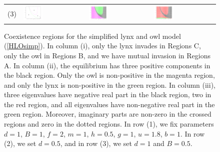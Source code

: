 \documentclass[12pt]{UOthesis}
\theoremstyle{remarkstyle}
\begin{document}
\begin{figure}[h!]
\begin{tabular}{m{0.07cm} m{4.5cm}  m{4.5cm}  m{4.5cm}}
		(3) & \includegraphics[width=0.33\textwidth]{HLOSimpMutualInvasion3.png} & \includegraphics[width=0.33\textwidth]{HLOSimpSSE3.png} & \includegraphics[width=0.33\textwidth]{HLOSimpE3.png}\\
	\end{tabular}
	\caption[Regions for the simplified lynx and owl model]{Coexistence regions for the simplified lynx and owl model (\ref{HLOsimp}). In column (i), only the lynx invades in Regions C, only the owl in Regions B, and we have mutual invasion in Regions A. In column (ii), the equilibrium has three positive components in the black region. Only the owl is non-positive in the magenta region, and only the lynx is non-positive in the green region. In column (iii), three eigenvalues have negative real part in the black region, two in the red region, and all eigenvalues have non-negative real part in the green region. Moreover, imaginary parts are non-zero in the crossed regions and zero in the dotted regions. In row (1), we fix parameters $d=1$, $B=1$, $f=2$, $m=1$, $h=0.5$, $g=1$, $u=1.8$, $b=1$. In row (2), we set $d=0.5$, and in row (3), we set $d=1$ and $B=0.5$.\label{HLOSimpPlots}}%
\end{figure}
\end{document}
